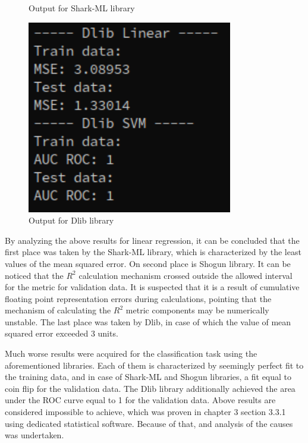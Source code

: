 \begin{figure}[!ht]
\begin{minipage}{0.31\textwidth}
		\caption{Output for Shark-ML library}
		\label{fig:shark_linear_svm}		
	\end{minipage}%
	\hspace{0.02\textwidth}
	\begin{minipage}{0.31\textwidth}
		\centering
		\includegraphics[width=0.8\textwidth]{Rysunki/Rozdzial7/dlib}
		\caption{Output for Dlib library}
		\label{fig:dlib_linear_svm}
	\end{minipage}
\end{figure}

By analyzing the above results for linear regression, it can be concluded that the first place was taken by the Shark-ML library, which is characterized by the least values of the mean squared error. On second place is Shogun library. It can be noticed that the $R^2$ calculation mechanism crossed outside the allowed interval for the metric for validation data. It is suspected that it is a result of cumulative floating point representation errors during calculations, pointing that the mechanism of calculating the $R^2$ metric components may be numerically unstable. The last place was taken by Dlib, in case of which the value of mean squared error exceeded 3 units.

Much worse results were acquired for the classification task using the aforementioned libraries. Each of them is characterized by seemingly perfect fit to the training data, and in case of Shark-ML and Shogun libraries, a fit equal to coin flip for the validation data. The Dlib library additionally achieved the area under the ROC curve equal to 1 for the validation data. Above results are considered impossible to achieve, which was proven in chapter 3 section 3.3.1 using dedicated statistical software. Because of that, and analysis of the causes was undertaken.


